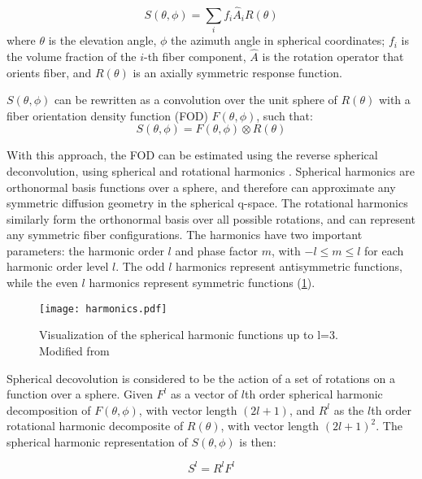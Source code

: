 \begin{equation}
S(\theta, \phi) = \sum_{i}^{} f_i \hat{A}_i R(\theta)
\end{equation}
where $\theta$ is the elevation angle,  $\phi$ the azimuth angle in spherical coordinates; $f_i$ is the volume fraction of the $i$-th fiber component, $\hat{A}$ is the rotation operator that orients fiber, and $R(\theta)$ is an axially symmetric response function. 

$S(\theta,\phi) $ can be rewritten as a convolution over the unit sphere of $R(\theta)$ with a fiber orientation density function (FOD) $F(\theta, \phi)$, such that:
\begin{equation}
S(\theta, \phi) = F(\theta, \phi) \otimes R(\theta)
\end{equation}

With this approach, the FOD can be estimated using the reverse spherical deconvolution, using spherical and rotational harmonics \cite{Healy1998}. Spherical harmonics are orthonormal basis functions over a sphere, and therefore can approximate any symmetric diffusion geometry in the spherical q-space. The rotational harmonics similarly form the orthonormal basis over all possible rotations, and can represent any symmetric fiber configurations. The harmonics have two important parameters: the harmonic order $l$ and phase factor $m$, with $ -l \leq m \leq l $ for each harmonic order level $l$. The odd $l$ harmonics represent antisymmetric functions, while the even $l$ harmonics represent symmetric functions (\ref{fig:harmonics}). 

\begin{figure}[ht]
\begin{center}
\texttt{[image: harmonics.pdf]}
\caption{Visualization of the spherical harmonic functions up to l=3. Modified from \protect\cite{sh-image-wikipedia}}
\label{fig:harmonics}
\end{center}
\end{figure}

Spherical decovolution is considered to be the action of a set of rotations on a function over a sphere. Given $F^l $ as a vector of $l$th order spherical harmonic decomposition of  $F(\theta,\phi)$, with vector length $(2l + 1)$, and $R^l$ as the $l$th order rotational harmonic decomposite of $R(\theta)$, with vector length $(2l+1)^2$. The spherical harmonic representation of $S(\theta,\phi)$ is then:

\begin{equation}
S^l = R^l F^l
\end{equation}

